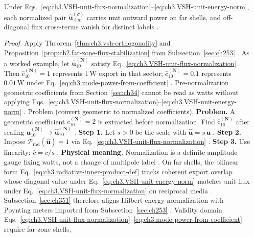 \begin{theorem}
\label{thm:ch3.vsh-unit-flux-diagonal}
Under Eqs.~\eqref{eq:ch3.VSH-unit-flux-normalization}--\eqref{eq:ch3.VSH-unit-energy-norm}, each normalized pair
\(\widehat{\mathbf{u}}_{\ell m}^{(\sigma)}\) carries unit outward power on far shells, and off-diagonal flux
cross-terms vanish for distinct labels \cite{stratton1941}.
\end{theorem}
\noindent\textit{Proof.}
Apply Theorem~\ref{thm:ch3.vsh-orthogonality} and Proposition~\ref{prop:ch2.far-zone-flux-stabilization} from
Subsection~\ref{sec:ch253} \cite{stratton1941}.
As a worked example, let \(\widehat{\mathbf{u}}_{10}^{(\mathbf{N})}\) satisfy Eq.~\eqref{eq:ch3.VSH-unit-flux-normalization}. Then
\(\widehat{c}_{10}^{(\mathbf{N})}=1\) represents \(1\,\mathrm{W}\) export in that sector; \(\widehat{c}_{10}^{(\mathbf{N})}=0.1\)
represents \(0.01\,\mathrm{W}\) under Eq.~\eqref{eq:ch3.mode-power-from-coefficient} \cite{harrington2001}.
Pre-normalization geometric coefficients from Section~\ref{sec:ch34} cannot be read as watts without applying
Eqs.~\eqref{eq:ch3.VSH-unit-flux-normalization}--\eqref{eq:ch3.VSH-unit-energy-norm} \cite{poynting1884}.
Problem (convert geometric to normalized coefficients). \textbf{Problem.} A geometric coefficient \(c_{10}^{(\mathbf{N})}=2\) is extracted before normalization. Find
\(\widehat{c}_{10}^{(\mathbf{N})}\) after scaling \(\mathbf{u}_{10}^{(\mathbf{N})}\to\widehat{\mathbf{u}}_{10}^{(\mathbf{N})}\)
\cite{hansen1988}.
\textbf{Step 1.} Let \(s>0\) be the scale with \(\widehat{\mathbf{u}}=s\,\mathbf{u}\) \cite{stratton1941}.
\textbf{Step 2.} Impose \(\mathcal{P}_{\mathrm{rad}}(\widehat{\mathbf{u}})=1\) via Eq.~\eqref{eq:ch3.VSH-unit-flux-normalization}
\cite{poynting1884}.
\textbf{Step 3.} Use linearity: \(\widehat{c}=c/s\) \cite{hansen1988}.
\textbf{Physical meaning.} Normalization is a definite amplitude gauge fixing watts, not a change of multipole label
\cite{harrington2001}.
On far shells, the bilinear form Eq.~\eqref{eq:ch3.radiative-inner-product-def} tracks coherent export overlap whose
diagonal value under Eq.~\eqref{eq:ch3.VSH-unit-energy-norm} matches unit flux under
Eq.~\eqref{eq:ch3.VSH-unit-flux-normalization} on reciprocal media \cite{stratton1941}. Subsection~\ref{sec:ch351}
therefore aligns Hilbert energy normalization with Poynting meters imported from Subsection~\ref{sec:ch253}
\cite{poynting1884}.
Validity domain. Eqs.~\eqref{eq:ch3.VSH-unit-flux-normalization}--\eqref{eq:ch3.mode-power-from-coefficient} require far-zone shells,
